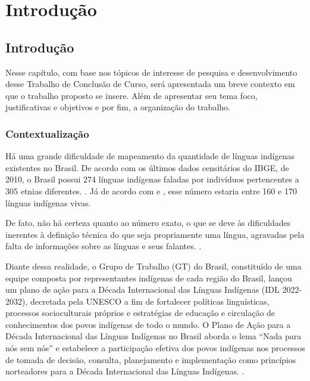 \setcounter{chapter}{1}
\chapter*[Introdução]{Introdução}
\section{Introdução}

Nesse capítulo, com base nos tópicos de interesse de pesquisa e desenvolvimento desse Trabalho de Conclusão de Curso, será apresentada um breve contexto em que o trabalho
proposto se insere. Além de apresentar seu tema foco, justificativas e objetivos e por fim, a organização do trabalho.

\subsection{Contextualização}

Há uma grande dificuldade de mapeamento da quantidade de línguas indígenas existentes no Brasil. De acordo com os últimos dados censitários do IBGE, de 2010, o Brasil
possui 274 línguas indígenas faladas por indivíduos pertencentes a 305 etnias diferentes. \cite{ibge}. Já de acordo com \cite{galucioetal2018} e
\cite{dangelis2014}, esse número estaria entre 160 e 170 línguas indígenas vivas.

De fato, não há certeza quanto ao número exato, o que se deve às dificuldades inerentes à definição técnica do que seja propriamente uma língua, agravadas pela falta de
informações sobre as línguas e seus falantes. \cite{seki2000}.

Diante dessa realidade, o Grupo de Trabalho (GT) do Brasil, constituído de uma equipe composta por representantes indígenas de cada região do Brasil, lançou um plano de
ação para a Década Internacional das Línguas Indígenas (IDL 2022-2032), decretada pela UNESCO a fim de fortalecer políticas linguísticas, processos socioculturais
próprios e estratégias de educação e circulação de conhecimentos dos povos indígenas de todo o mundo. O Plano de Ação para a Década Internacional das Línguas Indígenas no
Brasil aborda o lema “Nada para nós sem nós” e estabelece a participação efetiva dos povos indígenas nos processos de tomada de decisão, consulta, planejamento e
implementação como princípios norteadores para a Década Internacional das Línguas Indígenas. \cite{gtbrasil2021}.

